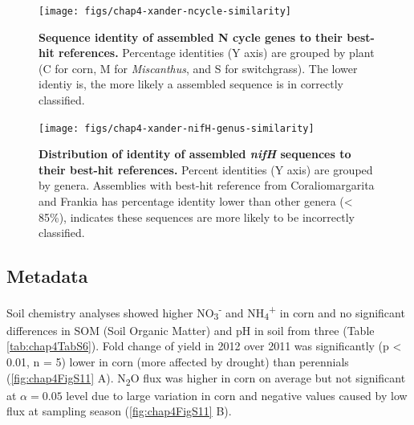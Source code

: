 \documentclass[]{msu-thesis}
\begin{document}
\begin{figure}[tbph!]
  \centering
  \texttt{[image: figs/chap4-xander-ncycle-similarity]}
  \caption[Sequence identity of assembled N cycle genes to their
  best-hit references]{\textbf{Sequence identity of assembled N cycle
  genes to their best-hit references.} Percentage identities (Y axis)
  are grouped by plant (C for corn, M for \textit{Miscanthus}, and S for
switchgrass). The lower identiy is, the more likely a assembled sequence
is in correctly classified.}
  \label{fig:chap4FigS9}
\end{figure}


\begin{figure}[tbph!]
  \centering
  \texttt{[image: figs/chap4-xander-nifH-genus-similarity]}
  \caption[Distribution of identity of assembled \textit{nifH} sequences
  to their best-hit references]{\textbf{Distribution of identity of
    assembled \textit{nifH} sequences to their best-hit references.}
  Percent identities (Y axis) are grouped by genera. Assemblies with
best-hit reference from Coraliomargarita and Frankia has percentage
identity lower than other genera (< 85\%), indicates these sequences are
more likely to be incorrectly classified.}
  \label{fig:chap4FigS10}
\end{figure}

\subsection{Metadata}
Soil chemistry analyses showed higher NO\textsubscript{3}\textsuperscript{-} and NH\textsubscript{4}\textsuperscript{+} in corn and
no significant differences in SOM (Soil Organic Matter) and pH in soil
from three (Table \ref{tab:chap4TabS6}). Fold change of yield in 2012
over 2011 was significantly (p < 0.01, n = 5) lower in corn (more
affected by drought) than perennials (\cref{fig:chap4FigS11} A). N\textsubscript{2}O flux was higher in corn on average but not significant at $\alpha = 0.05$ level due to large variation in corn and negative values caused by low flux at sampling season (\cref{fig:chap4FigS11} B).
\end{document}
